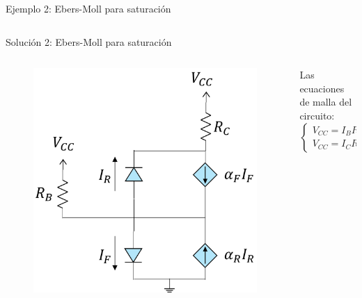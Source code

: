 \documentclass[t,aspectratio=169]{beamer}
\begin{document}
\begin{frame}{Ejemplo 2: Ebers-Moll para saturación}
\begin{columns}
\begin{column}{0.3\textwidth}
\end{column}

\end{columns}

\end{frame}


\begin{frame}{Solución 2: Ebers-Moll para saturación}

\begin{columns}

\begin{column}{0.4\textwidth}

\begin{figure}
    \centering
    \includegraphics[width=\textwidth]{figuras/ebers_moll_circuito_ejemplo_2.png}
\end{figure}

\end{column}

\begin{column}{0.6\textwidth}

Las ecuaciones de malla del circuito:
\begin{equation*}
\begin{cases}
    V_{CC} = I_B R_B + V_{BE} \\
    V_{CC} = I_C R_C + V_{CE}
\end{cases}
\end{equation*}


\end{column}
\end{columns}
\end{frame}
\end{document}
